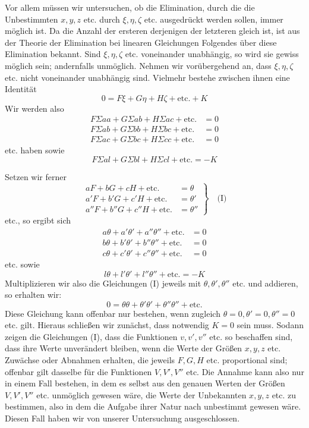 Vor allem müssen wir untersuchen, ob die Elimination, durch die die Unbestimmten \(x,y,z\) etc. durch \(\xi,\eta,\zeta\) etc. ausgedrückt werden sollen, immer möglich ist. Da die Anzahl der ersteren derjenigen der letzteren gleich ist, ist aus der Theorie der Elimination bei linearen Gleichungen Folgendes über diese Elimination bekannt. Sind \(\xi,\eta,\zeta\) etc. voneinander unabhängig, so wird sie gewiss möglich sein; andernfalls unmöglich. Nehmen wir vorübergehend an, dass \(\xi,\eta,\zeta\) etc. nicht voneinander unabhängig sind. Vielmehr bestehe zwischen ihnen eine Identität
\[
0=F\xi+G\eta+H\zeta+\text{etc.}+K
\]
Wir werden also
\[
\begin{aligned}
F\Sigma aa+G\Sigma ab+H\Sigma ac+\text{etc.}&=0\\
F\Sigma ab+G\Sigma bb+H\Sigma bc+\text{etc.}&=0\\
F\Sigma ac+G\Sigma bc+H\Sigma cc+\text{etc.}&=0
\end{aligned}
\]
etc. haben sowie
\[
F\Sigma al+G\Sigma bl+H\Sigma cl+\text{etc.}=-K
\]
\par{}
Setzen wir ferner
\[
\left.\begin{aligned}
aF+bG+cH+\text{etc.}&=\theta\\
a'F+b'G+c'H+\text{etc.}&=\theta'\\
a''F+b''G+c''H+\text{etc.}&=\theta''
\end{aligned}\right\}\quad\text{(I)}
\]
etc., so ergibt sich
\[
\begin{aligned}
a\theta+a'\theta'+a''\theta''+\text{etc.}&=0\\
b\theta+b'\theta'+b''\theta''+\text{etc.}&=0\\
c\theta+c'\theta'+c''\theta''+\text{etc.}&=0
\end{aligned}
\]
etc. sowie
\[
l\theta+l'\theta'+l''\theta''+\text{etc.}=-K
\]
Multiplizieren wir also die Gleichungen (I) jeweils mit \(\theta,\theta',\theta''\) etc. und addieren, so erhalten wir:
\[
0=\theta\theta+\theta'\theta'+\theta''\theta''+\text{etc.}
\]
Diese Gleichung kann offenbar nur bestehen, wenn zugleich \(\theta=0,\allowbreak\theta'=0,\allowbreak\theta''=0\) etc. gilt. Hieraus schließen wir zunächst, dass notwendig \(K=0\) sein muss. Sodann zeigen die Gleichungen (I), dass die Funktionen \(v,v',v''\) etc. so beschaffen sind, dass ihre Werte unverändert bleiben, wenn die Werte der Größen \(x,y,z\) etc. Zuwächse oder Abnahmen erhalten, die jeweils \(F,G,H\) etc. proportional sind; offenbar gilt dasselbe für die Funktionen \(V,V',V''\) etc. Die Annahme kann also nur in einem Fall bestehen, in dem es selbst aus den genauen Werten der Größen \(V,V',V''\) etc. unmöglich gewesen wäre, die Werte der Unbekannten \(x,y,z\) etc. zu bestimmen, also in dem die Aufgabe ihrer Natur nach unbestimmt gewesen wäre. Diesen Fall haben wir von unserer Untersuchung ausgeschlossen.
